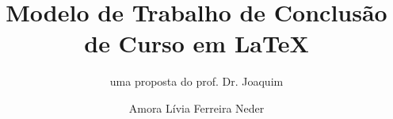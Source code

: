 \documentclass[12pt, twoside, openright, fleqn]{memoir}
\title{Modelo de Trabalho de Conclusão de Curso em {\LaTeX}} %
\subtitle{uma proposta do prof. Dr. Joaquim}        %
\author[fem]{Amora Lívia Ferreira Neder}            %
\begin{document}
\CoverPage      %
\FacePage       %
\CatalogPage    %
\ProofPage      %
\DedicationPage %
\ThanksPage     %
\EpigraphPage   %
\AbstractPT     %
\AbstractEN     %
\AcronymsPage   %


\TableOfContents    %








\MakeBibliography %

\end{document}
